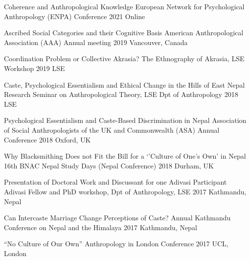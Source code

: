 \begin{cvpresentations}

  \cvpresentation
    {Coherence and Anthropological Knowledge} %
    {European Network for Psychological Anthropology (ENPA) Conference} %
    {2021} %
    {Online} %

  \cvpresentation
    {Ascribed Social Categories and their Cognitive Basis} %
    {American Anthropological Association (AAA) Annual meeting} %
    {2019} %
    {Vancouver, Canada} %

  \cvpresentation
    {Coordination Problem or Collective Akrasia?} %
    {The Ethnography of Akrasia, LSE Workshop} %
    {2019} %
    {LSE} %

  \cvpresentation
    {Caste, Psychological Essentialism and Ethical Change in the Hills of East Nepal} %
    {Research Seminar on Anthropological Theory, LSE Dpt of Anthropology} %
    {2018} %
    {LSE} %


  \cvpresentation
    {Psychological Essentialism and Caste-Based Discrimination in Nepal} %
    {Association of Social Anthropologists of the UK and Commonwealth (ASA) Annual Conference} %
    {2018} %
    {Oxford, UK} %


  \cvpresentation
    {Why Blacksmithing Does not Fit the Bill for a `'Culture of One's Own' in Nepal} %
    {16th BNAC Nepal Study Days (Nepal Conference)} %
    {2018} %
    {Durham, UK} %

\end{cvpresentations}
\begin{cvpresentations}

  \cvpresentation
    {Presentation of Doctoral Work and Discussant for one Adivasi Participant} %
    {Adivasi Fellow and PhD workshop, Dpt of Anthropology, LSE} %
    {2017} %
    {Kathmandu, Nepal} %

  \cvpresentation
    {Can Intercaste Marriage Change Perceptions of Caste?} %
    {Annual Kathmandu Conference on Nepal and the Himalaya} %
    {2017} %
    {Kathmandu, Nepal} %


  \cvpresentation
    {``No Culture of Our Own''} %
    {Anthropology in London Conference} %
    {2017} %
    {UCL, London} %


\end{cvpresentations}

